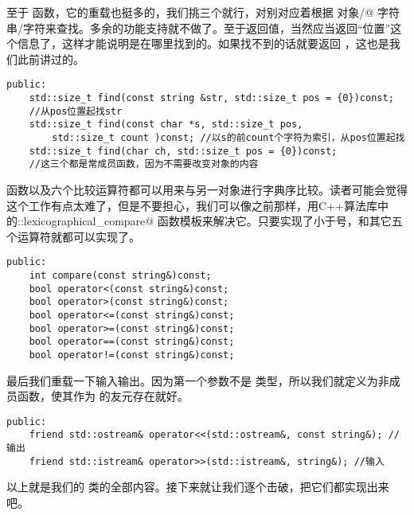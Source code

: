 至于 \lstinline@find@ 函数，它的重载也挺多的，我们挑三个就行，对别对应着根据 \lstinline@string@ 对象/\lstinline@char[N]@ 字符串/字符来查找。多余的功能支持就不做了。至于返回值，当然应当返回``位置''这个信息了，这样才能说明是在哪里找到的。如果找不到的话就要返回 \lstinline@npos@，这也是我们此前讲过的。
\begin{lstlisting}
public:
    std::size_t find(const string &str, std::size_t pos = {0})const;
    //从pos位置起找str
    std::size_t find(const char *s, std::size_t pos,
        std::size_t count )const; //以s的前count个字符为索引，从pos位置起找
    std::size_t find(char ch, std::size_t pos = {0})const;
    //这三个都是常成员函数，因为不需要改变对象的内容
\end{lstlisting}\par
\lstinline@compare@ 函数以及六个比较运算符都可以用来与另一对象进行字典序比较。读者可能会觉得这个工作有点太难了，但是不要担心，我们可以像之前那样，用C++算法库中的\newline\lstinline@std::lexicographical_compare@ 函数模板来解决它。只要实现了小于号，\lstinline@compare@ 和其它五个运算符就都可以实现了。
\begin{lstlisting}
public:
    int compare(const string&)const;
    bool operator<(const string&)const;
    bool operator>(const string&)const;
    bool operator<=(const string&)const;
    bool operator>=(const string&)const;
    bool operator==(const string&)const;
    bool operator!=(const string&)const;
\end{lstlisting}\par
最后我们重载一下输入输出。因为第一个参数不是 \lstinline@string@ 类型，所以我们就定义为非成员函数，使其作为 \lstinline@string@ 的友元存在就好。
\begin{lstlisting}
public:
    friend std::ostream& operator<<(std::ostream&, const string&); //输出
    friend std::istream& operator>>(std::istream&, string&); //输入
\end{lstlisting}\par
以上就是我们的 \lstinline@string@ 类的全部内容。接下来就让我们逐个击破，把它们都实现出来吧。\par
